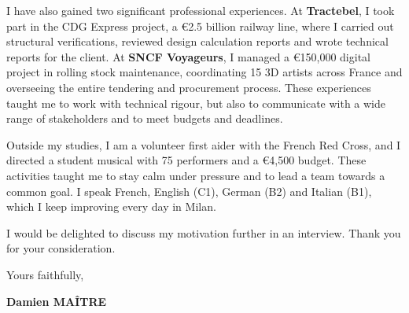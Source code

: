 \documentclass[a4paper,11pt]{extarticle}
\begin{document}
I have also gained two significant professional experiences. At \textbf{Tractebel}, I took part in the CDG Express project, a €2.5 billion railway line, where I carried out structural verifications, reviewed design calculation reports and wrote technical reports for the client. At \textbf{SNCF Voyageurs}, I managed a €150,000 digital project in rolling stock maintenance, coordinating 15 3D artists across France and overseeing the entire tendering and procurement process. These experiences taught me to work with technical rigour, but also to communicate with a wide range of stakeholders and to meet budgets and deadlines.

Outside my studies, I am a volunteer first aider with the French Red Cross, and I directed a student musical with 75 performers and a €4,500 budget. These activities taught me to stay calm under pressure and to lead a team towards a common goal. I speak French, English (C1), German (B2) and Italian (B1), which I keep improving every day in Milan.

I would be delighted to discuss my motivation further in an interview. Thank you for your consideration.

Yours faithfully,

\vspace{14pt}
\begin{flushright}
  \textbf{\color{accent}Damien MAÎTRE}
\end{flushright}
\end{document}

